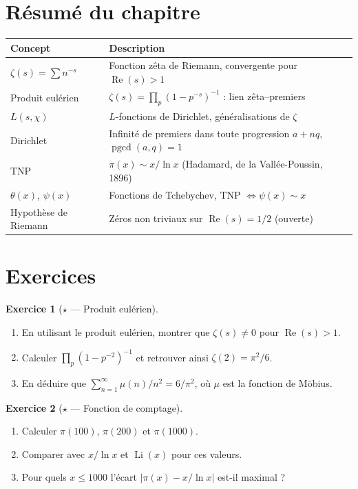 \documentclass[12pt,a4paper,openany]{book}
\theoremstyle{definition}
\newtheorem{exercice}{Exercice}[chapter]
\theoremstyle{plain}
\theoremstyle{remark}
\DeclareMathOperator{\pgcd}{pgcd}
\begin{document}

\section{Résumé du chapitre}
\label{sec:resume-ch10}

\begin{center}
\begin{tabular}{lp{9cm}}
\toprule
\textbf{Concept} & \textbf{Description} \\
\midrule
$\zeta(s) = \sum n^{-s}$ & Fonction zêta de Riemann, convergente pour $\operatorname{Re}(s) > 1$ \\
Produit eulérien & $\zeta(s) = \prod_p (1-p^{-s})^{-1}$ : lien zêta--premiers \\
$L(s,\chi)$ & $L$-fonctions de Dirichlet, généralisations de $\zeta$ \\
Dirichlet & Infinité de premiers dans toute progression $a + nq$, $\pgcd(a,q)=1$ \\
TNP & $\pi(x) \sim x/\ln x$ (Hadamard, de la Vallée-Poussin, 1896) \\
$\theta(x)$, $\psi(x)$ & Fonctions de Tchebychev, TNP $\iff \psi(x) \sim x$ \\
Hypothèse de Riemann & Zéros non triviaux sur $\operatorname{Re}(s) = 1/2$ (ouverte) \\
\bottomrule
\end{tabular}
\end{center}

\section{Exercices}
\label{sec:exercices-ch10}

\begin{exercice}[$\star$ --- Produit eulérien]
\label{exo:produit-eulerien}
\begin{enumerate}[label=(\alph*)]
  \item En utilisant le produit eulérien, montrer que $\zeta(s) \neq 0$ pour
    $\operatorname{Re}(s) > 1$.
  \item Calculer $\prod_{p} (1 - p^{-2})^{-1}$ et retrouver ainsi $\zeta(2) = \pi^2/6$.
  \item En déduire que $\sum_{n=1}^{\infty} \mu(n)/n^2 = 6/\pi^2$, où $\mu$ est
    la fonction de Möbius.
\end{enumerate}
\end{exercice}

\begin{exercice}[$\star$ --- Fonction de comptage]
\label{exo:fonction-comptage}
\begin{enumerate}[label=(\alph*)]
  \item Calculer $\pi(100)$, $\pi(200)$ et $\pi(1000)$.
  \item Comparer avec $x/\ln x$ et $\operatorname{Li}(x)$ pour ces valeurs.
  \item Pour quels $x \leq 1000$ l'écart $|\pi(x) - x/\ln x|$ est-il maximal ?
\end{enumerate}
\end{exercice}
\end{document}
